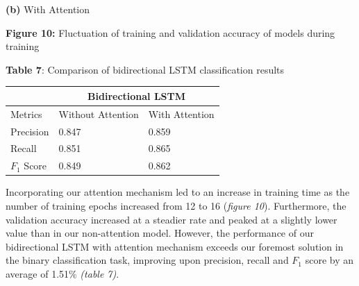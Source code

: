 \documentclass[12pt,a4paper]{article}
\begin{document}
\begin{minipage}{0.5\textwidth}
\begin{minipage}{0.48\textwidth}
\begin{center}
			\hspace{-1cm}\textbf{(b)} With Attention\\
		\end{center}
	\end{minipage}
	\vspace{-5pt}\begin{center}
		\hspace{-20pt}\textbf{Figure 10:} Fluctuation of training and validation accuracy of models during training\\
	\end{center}
\end{minipage}
\hspace{-10pt}
\begin{minipage}{0.5\textwidth}
	\begin{center}
		\textbf{Table 7}: Comparison of bidirectional LSTM classification results\vspace{5pt}
		\begin{tabular}{|p{1.6cm}||p{1.8cm}|p{2cm}|}
			\hline
			& \multicolumn{2}{c|}{Bidirectional LSTM} \\
			\hline
			Metrics & Without Attention &  With Attention\\
			\hline\hline
			Precision & 0.847 & 0.859\\
			\hline
			Recall & 0.851 & 0.865\\
			\hline
			$F_1$ Score  & 0.849 & 0.862\\
			\hline
		\end{tabular}
	\end{center}	
\end{minipage}\vspace{10pt}

\noindent Incorporating our attention mechanism led to an increase in training time as the number of training epochs increased from 12 to 16 (\textit{figure 10}). Furthermore, the validation accuracy increased at a steadier rate and peaked at a slightly lower value than in our non-attention model. However, the performance of our bidirectional LSTM with attention mechanism exceeds our foremost solution in the binary classification task, improving upon precision, recall and $F_1$ score by an average of 1.51\% \textit{(table 7)}.

\end{document}
